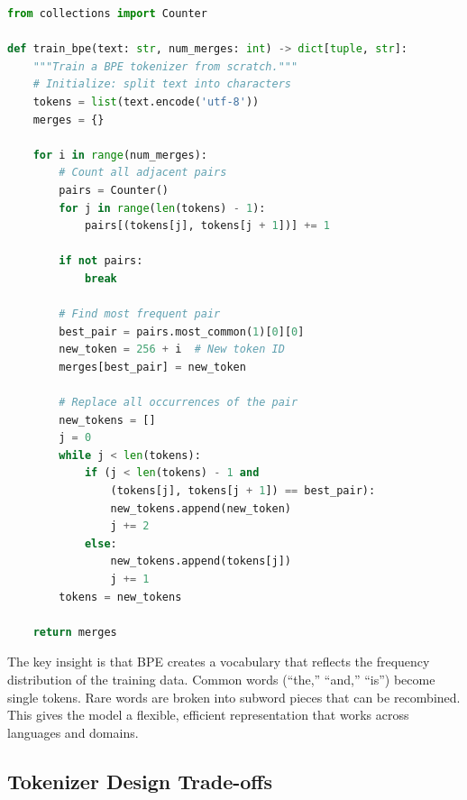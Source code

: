 \begin{lstlisting}[language=Python, caption={Simplified BPE training algorithm}]
from collections import Counter

def train_bpe(text: str, num_merges: int) -> dict[tuple, str]:
    """Train a BPE tokenizer from scratch."""
    # Initialize: split text into characters
    tokens = list(text.encode('utf-8'))
    merges = {}
    
    for i in range(num_merges):
        # Count all adjacent pairs
        pairs = Counter()
        for j in range(len(tokens) - 1):
            pairs[(tokens[j], tokens[j + 1])] += 1
        
        if not pairs:
            break
        
        # Find most frequent pair
        best_pair = pairs.most_common(1)[0][0]
        new_token = 256 + i  # New token ID
        merges[best_pair] = new_token
        
        # Replace all occurrences of the pair
        new_tokens = []
        j = 0
        while j < len(tokens):
            if (j < len(tokens) - 1 and 
                (tokens[j], tokens[j + 1]) == best_pair):
                new_tokens.append(new_token)
                j += 2
            else:
                new_tokens.append(tokens[j])
                j += 1
        tokens = new_tokens
    
    return merges
\end{lstlisting}

The key insight is that BPE creates a vocabulary that reflects the frequency distribution of the training data. Common words (``the,'' ``and,'' ``is'') become single tokens. Rare words are broken into subword pieces that can be recombined. This gives the model a flexible, efficient representation that works across languages and domains.

\subsection{Tokenizer Design Trade-offs}

